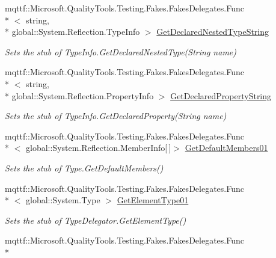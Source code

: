 \begin{DoxyCompactItemize}
mqttf\-::\-Microsoft.\-Quality\-Tools.\-Testing.\-Fakes.\-Fakes\-Delegates.\-Func\\*
$<$ string, \\*
global\-::\-System.\-Reflection.\-Type\-Info $>$ \hyperlink{class_system_1_1_reflection_1_1_fakes_1_1_stub_type_delegator_af8500d0fbc82aef76f7c0cef0006d1c4}{Get\-Declared\-Nested\-Type\-String}
\begin{DoxyCompactList}\small\item\em Sets the stub of Type\-Info.\-Get\-Declared\-Nested\-Type(\-String name)\end{DoxyCompactList}\item 
mqttf\-::\-Microsoft.\-Quality\-Tools.\-Testing.\-Fakes.\-Fakes\-Delegates.\-Func\\*
$<$ string, \\*
global\-::\-System.\-Reflection.\-Property\-Info $>$ \hyperlink{class_system_1_1_reflection_1_1_fakes_1_1_stub_type_delegator_a76ace4e1af87c608bb1810297cf21732}{Get\-Declared\-Property\-String}
\begin{DoxyCompactList}\small\item\em Sets the stub of Type\-Info.\-Get\-Declared\-Property(\-String name)\end{DoxyCompactList}\item 
mqttf\-::\-Microsoft.\-Quality\-Tools.\-Testing.\-Fakes.\-Fakes\-Delegates.\-Func\\*
$<$ global\-::\-System.\-Reflection.\-Member\-Info\mbox{[}$\,$\mbox{]}$>$ \hyperlink{class_system_1_1_reflection_1_1_fakes_1_1_stub_type_delegator_a3eeee3f86f2a2f47dc66dd3b834d2910}{Get\-Default\-Members01}
\begin{DoxyCompactList}\small\item\em Sets the stub of Type.\-Get\-Default\-Members()\end{DoxyCompactList}\item 
mqttf\-::\-Microsoft.\-Quality\-Tools.\-Testing.\-Fakes.\-Fakes\-Delegates.\-Func\\*
$<$ global\-::\-System.\-Type $>$ \hyperlink{class_system_1_1_reflection_1_1_fakes_1_1_stub_type_delegator_a2ef1cd32d0d61ba0270c5e17d1220815}{Get\-Element\-Type01}
\begin{DoxyCompactList}\small\item\em Sets the stub of Type\-Delegator.\-Get\-Element\-Type()\end{DoxyCompactList}\item 
mqttf\-::\-Microsoft.\-Quality\-Tools.\-Testing.\-Fakes.\-Fakes\-Delegates.\-Func\\*

\end{DoxyCompactItemize}
